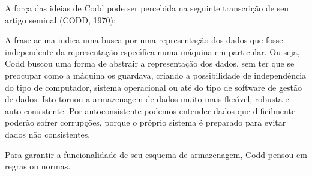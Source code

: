 \documentclass[
12pt,		%
openright,	%
twoside,  %
a4paper,			%
chapter=TITLE,		%
english,			%
french,				%
spanish,			%
brazil				%
]{USPSC-classe/USPSC}
\begin{document}
A for\c{c}a das ideias de Codd pode ser percebida na seguinte transcri\c{c}\~ao de seu artigo seminal (CODD, 1970):


















\noindent\begin{center}\mbox{\centering{}}\end{center}


A frase acima indica uma busca por uma representa\c{c}\~ao dos dados que fosse independente da representa\c{c}\~ao espec\'{\i}fica numa m\'aquina em particular. Ou seja, Codd buscou uma forma de abstrair a representa\c{c}\~ao dos dados, sem ter que se preocupar como a m\'aquina os guardava, criando a possibilidade de independ\^encia do tipo de computador, sistema operacional ou at\'e do tipo de software de gest\~ao de dados. Isto tornou a armazenagem de dados muito mais flex\'{\i}vel, robusta e auto-consistente. Por autoconsistente podemos entender dados que dificilmente poder\~ao sofrer corrup\c{c}\~oes, porque o pr\'oprio sistema \'e preparado para evitar dados n\~ao consistentes.

















Para garantir a funcionalidade de seu esquema de armazenagem, Codd pensou em \textquotedbl  regras \textquotedbl  ou normas.
\end{document}
